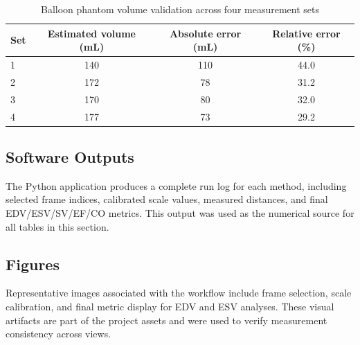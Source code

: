 \begin{table}[htbp]
\caption{Balloon phantom volume validation across four measurement sets}
\label{tab:balloon}
\centering
\begin{tabular}{lccc}
\toprule
Set & Estimated volume (mL) & Absolute error (mL) & Relative error (\%) \\
\midrule
1 & 140 & 110 & 44.0 \\
2 & 172 & 78 & 31.2 \\
3 & 170 & 80 & 32.0 \\
4 & 177 & 73 & 29.2 \\
\bottomrule
\end{tabular}
\end{table}

\subsection{Software Outputs}
The Python application produces a complete run log for each method, including selected frame indices, calibrated scale values, measured distances, and final EDV/ESV/SV/EF/CO metrics. This output was used as the numerical source for all tables in this section.

\subsection{Figures}
Representative images associated with the workflow include frame selection, scale calibration, and final metric display for EDV and ESV analyses. These visual artifacts are part of the project assets and were used to verify measurement consistency across views.
